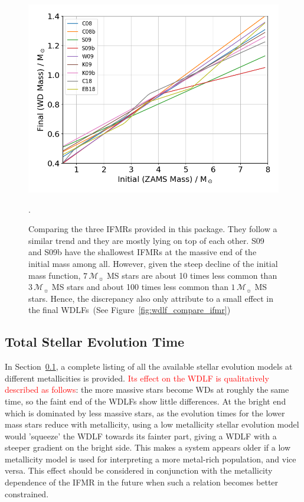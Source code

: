 \documentclass[fleqn,usenatbib]{rasti}
\newcommand{\msun}{\mathcal{M}_{\sun}}
\begin{document}
\begin{figure}
    \centering
    \includegraphics[width=\columnwidth]{fig_06_ifmrs.png}
    \caption{Comparing the three IFMRs provided in this package. They follow
    a similar trend and they are mostly lying on top of each other. S09 and S09b
    have the shallowest IFMRs at the massive end of the initial mass among all.
    However, given the steep decline of the initial mass function, $7\,\msun$
    MS stars are about 10 times less common than $3\,\msun$ MS stars and about
    100 times less common than $1\,\msun$ MS stars. Hence, the discrepancy also
    only attribute to a small effect in the final WDLFs~(See
    Figure~\ref{fig:wdlf_compare_ifmr})}.
    \label{fig:ifmrs}
\end{figure}









\subsection{Total Stellar Evolution Time}
\label{sec:evolution_time}
In Section~\ref{sec:evolution_time}, a complete listing of all the available
stellar evolution models at different metallicities is provided. \textcolor{red}{Its effect on
the WDLF is qualitatively described as follows}: the more
massive stars become WDs at roughly the same time, so the faint end of the
WDLFs show little differences. At the bright end which is dominated by less
massive stars, as the evolution times for the lower mass stars reduce with
metallicity, using a low metallicity stellar evolution model would 'squeeze'
the WDLF towards its fainter part, giving a WDLF with a steeper gradient on
the bright side. This makes a system appears older if a low metallicity
model is used for interpreting a more metal-rich population, and vice versa.
This effect should be considered in conjunction with the metallicity
dependence of the IFMR in the future when such a relation becomes better
constrained.
\end{document}
